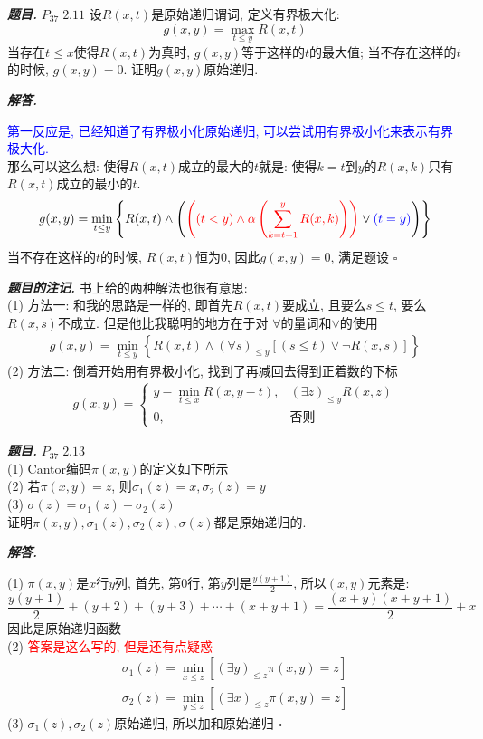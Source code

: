 \documentclass[10pt, a4paper, oneside]{ctexart}
\newenvironment{problem}{\begin{framed}\par\noindent\textbf{\textit{题目. }}}{\end{framed}\par}
\newenvironment{solution}{%
  \par\noindent\textbf{\textit{解答. }}\ignorespaces
}{%
  \hfill\ensuremath{\square}\par
}
\newenvironment{note}{\par\noindent\textbf{\textit{题目的注记. }}\ignorespaces}{\par}
\begin{document}
\begin{problem}
$P_{37}\; 2.11$ 设$R(x,t)$是原始递归谓词, 定义有界极大化:
$$g(x,y)=\max_{t\leq y}R(x,t)$$
当存在$t\leq x$使得$R(x,t)$为真时, $g(x,y)$等于这样的$t$的最大值; 当不存在这样的$t$的时候, $g(x,y)=0$. 证明$g(x,y)$原始递归.
\end{problem}
\begin{solution}
\textcolor{blue}{第一反应是, 已经知道了有界极小化原始递归, 可以尝试用有界极小化来表示有界极大化.}\\
那么可以这么想: 使得$R(x,t)$成立的最大的$t$就是: 使得$k=t$到$y$的$R(x,k)$只有$R(x,t)$成立的最小的$t$.
$$g(x,y)=\min_{t\leq y} \left\{  R(x,t) \wedge\left(\textcolor{red} { \left( (t<y) \wedge \alpha \left(  \sum_{k=t+1}^{y} R(x,k) \right) \right) }\vee  \textcolor{blue}{(t=y)}    \right) \right\}$$
当不存在这样的$t$的时候, $R(x,t)$恒为$0$, 因此$g(x,y)=0$, 满足题设
\end{solution}
\begin{note}
书上给的两种解法也很有意思:\\
(1) 方法一: 和我的思路是一样的, 即首先$R(x,t)$要成立, 且要么$s\leq t$, 要么$R(x,s)$不成立. 但是他比我聪明的地方在于对 $\forall$的量词和$\vee$的使用
\begin{align*}
    g(x,y)=\min_{t\leq y}\left\{ R(x,t)\wedge (\forall s)_{\leq y} [(s\leq t) \vee \neg R(x,s) ] \right\}
\end{align*}
(2) 方法二: 倒着开始用有界极小化, 找到了再减回去得到正着数的下标
\begin{align*}
    g(x,y)=\begin{cases}
        y-\min_{t\leq x}R(x,y-t),& (\exists z)_{\leq y} R(x,z)\\
        0, & \text{否则}
    \end{cases}
\end{align*}
\end{note}

\begin{problem}
$P_{37}\;2.13$\\
(1) Cantor编码$\pi(x,y)$的定义如下所示\\
(2) 若$\pi(x,y)=z$, 则$\sigma_1(z)=x, \sigma_2(z)=y$\\
(3) $\sigma(z)=\sigma_1(z)+\sigma_2(z)$\\
证明$\pi(x,y),\sigma_1(z),\sigma_2(z),\sigma(z)$都是原始递归的.
\end{problem}

\begin{solution}
(1) $\pi(x,y)$是$x$行$y$列, 首先, 第$0$行, 第$y$列是$\frac{y(y+1)}{2}$, 所以$(x,y)$元素是:
$$\frac{y(y+1)}{2}+(y+2)+(y+3)+\cdots+(x+y+1)=\frac{(x+y)(x+y+1)}{2}+x$$
因此是原始递归函数\\
(2) \textcolor{red}{答案是这么写的, 但是还有点疑惑}
\begin{align*}
    \sigma_1(z)=\min_{x\leq z}[(\exists y)_{\leq z} \pi(x,y)=z]\\
    \sigma_2(z)=\min_{y\leq z}[(\exists x)_{\leq z} \pi(x,y)=z]
\end{align*}
(3) $\sigma_1(z),\sigma_2(z)$原始递归, 所以加和原始递归
\end{solution}
\end{document}
